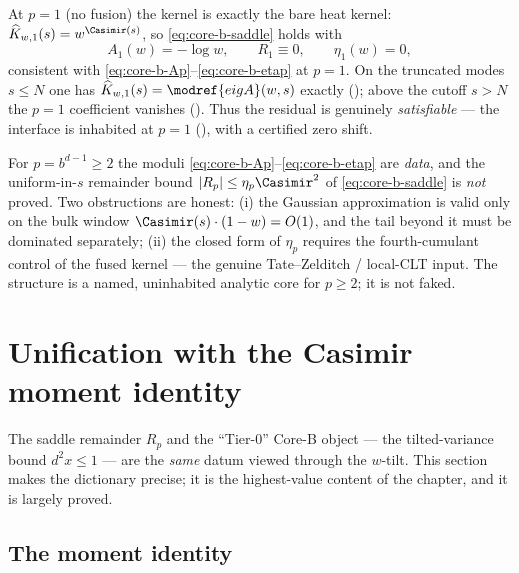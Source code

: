 \begin{proposition}[The $p=1$ anchor is exact; PROVED]
\label{prop:core-b-p1}
At $p=1$ (no fusion) the kernel is exactly the bare heat kernel:
$\widehat K_{w,1}(s)=w^{\Casimir(s)}$, so \eqref{eq:core-b-saddle} holds with
\[
  A_1(w) = -\log w,\qquad R_1\equiv 0,\qquad \eta_1(w) = 0,
\]
consistent with \eqref{eq:core-b-Ap}--\eqref{eq:core-b-etap} at $p=1$.  On the
truncated modes $s\le N$ one has $\widehat K_{w,1}(s)=\modref{eigA}(w,s)$ exactly
(); above the cutoff $s>N$ the
$p=1$ coefficient vanishes
().  Thus the residual is
genuinely \emph{satisfiable} — the interface is inhabited at $p=1$
(), with a certified zero shift.
\end{proposition}

\begin{remark}
\label{rem:core-b-gap-saddle}
For $p=b^{d-1}\ge 2$ the moduli \eqref{eq:core-b-Ap}--\eqref{eq:core-b-etap} are
\emph{data}, and the uniform-in-$s$ remainder bound $|R_p|\le\eta_p\Casimir^{2}$ of
\eqref{eq:core-b-saddle} is \emph{not} proved.  Two obstructions are honest: (i) the
Gaussian approximation is valid only on the bulk window
$\Casimir(s)\cdot(1-w)=O(1)$, and the tail beyond it must be dominated separately;
(ii) the closed form of $\eta_p$ requires the fourth-cumulant control of the fused
kernel — the genuine Tate--Zelditch / local-CLT input.  The structure
 is a named, uninhabited analytic core
for $p\ge 2$; it is not faked.
\end{remark}

\section{Unification with the Casimir moment identity}
\label{sec:core-b-moment}

The saddle remainder $R_p$ and the ``Tier-0'' Core-B object — the tilted-variance
bound $d^2 x\le 1$ — are the \emph{same} datum viewed through the $w$-tilt.  This
section makes the dictionary precise; it is the highest-value content of the
chapter, and it is largely proved.

\subsection{The moment identity}

